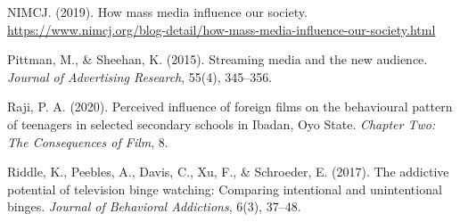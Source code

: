 \documentclass[12pt]{article}
\begin{document}
\begin{thebibliography}{13}
NIMCJ. (2019). How mass media influence our society. \url{https://www.nimcj.org/blog-detail/how-mass-media-influence-our-society.html}

Pittman, M., \& Sheehan, K. (2015). Streaming media and the new audience. \textit{Journal of Advertising Research}, 55(4), 345--356.

Raji, P. A. (2020). Perceived influence of foreign films on the behavioural pattern of teenagers in selected secondary schools in Ibadan, Oyo State. \textit{Chapter Two: The Consequences of Film}, 8.

Riddle, K., Peebles, A., Davis, C., Xu, F., \& Schroeder, E. (2017). The addictive potential of television binge watching: Comparing intentional and unintentional binges. \textit{Journal of Behavioral Addictions}, 6(3), 37--48.
\end{thebibliography}
\end{document}
